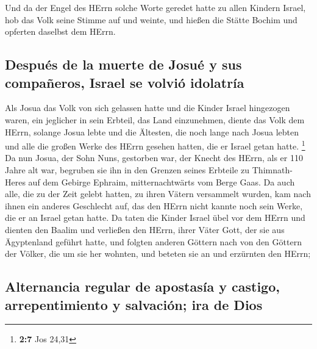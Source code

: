  Und da der Engel des HErrn solche Worte geredet hatte zu
allen Kindern Israel, hob das Volk seine Stimme auf und weinte,
 und hießen die Stätte Bochim und opferten daselbst dem
HErrn.

\hypertarget{despuuxe9s-de-la-muerte-de-josuuxe9-y-sus-compauxf1eros-israel-se-volviuxf3-idolatruxeda}{%
\subsection{Después de la muerte de Josué y sus compañeros, Israel se
volvió
idolatría}\label{despuuxe9s-de-la-muerte-de-josuuxe9-y-sus-compauxf1eros-israel-se-volviuxf3-idolatruxeda}}

 Als Josua das Volk von sich gelassen hatte und die Kinder
Israel hingezogen waren, ein jeglicher in sein Erbteil, das Land
einzunehmen,  diente das Volk dem HErrn, solange Josua
lebte und die Ältesten, die noch lange nach Josua lebten und alle die
großen Werke des HErrn gesehen hatten, die er Israel getan hatte.
\footnote{\textbf{2:7} Jos 24,31}  Da nun Josua, der Sohn
Nuns, gestorben war, der Knecht des HErrn, als er 110 Jahre alt war,
 begruben sie ihn in den Grenzen seines Erbteile zu
Thimnath-Heres auf dem Gebirge Ephraim, mitternachtwärts vom Berge Gaas.
 Da auch alle, die zu der Zeit gelebt hatten, zu ihren
Vätern versammelt wurden, kam nach ihnen ein anderes Geschlecht auf, das
den HErrn nicht kannte noch sein Werke, die er an Israel getan hatte.
 Da taten die Kinder Israel übel vor dem HErrn und
dienten den Baalim  und verließen den HErrn, ihrer Väter
Gott, der sie aus Ägyptenland geführt hatte, und folgten anderen Göttern
nach von den Göttern der Völker, die um sie her wohnten, und beteten sie
an und erzürnten den HErrn;

\hypertarget{alternancia-regular-de-apostasuxeda-y-castigo-arrepentimiento-y-salvaciuxf3n-ira-de-dios}{%
\subsection{Alternancia regular de apostasía y castigo, arrepentimiento
y salvación; ira de
Dios}\label{alternancia-regular-de-apostasuxeda-y-castigo-arrepentimiento-y-salvaciuxf3n-ira-de-dios}}

